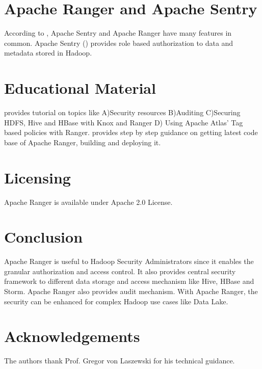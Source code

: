 \documentclass[9pt,twocolumn,twoside]{styles/osajnl}
\begin{document}
\section{Apache Ranger and Apache Sentry}
According to \cite{www-5security-blog}, Apache Sentry and Apache Ranger have
many features in common. Apache Sentry (\cite{www-apache-sentry}) provides
role based authorization to data and metadata stored in Hadoop.

\section{Educational Material}
\cite{www-ranger-tutorial} provides tutorial on topics like A)Security
resources B)Auditing C)Securing HDFS, Hive and HBase with Knox and Ranger D)
Using Apache Atlas' Tag based policies with Ranger.
\cite{www-ranger-quickstart} provides step by step guidance on getting latest
code base of Apache Ranger, building and deploying it.

\section{Licensing}
Apache Ranger is available under Apache 2.0 License.

\section{Conclusion}
Apache Ranger is useful to Hadoop Security Administrators since it enables
the granular authorization and access control. It also provides central
security framework to different data storage and access mechanism like Hive,
HBase and Storm. Apache Ranger also provides audit mechanism. With Apache
Ranger, the security can be enhanced for complex Hadoop use cases like Data
Lake.

\section*{Acknowledgements}

The authors thank Prof. Gregor von Laszewski for his technical guidance.



\end{document}
